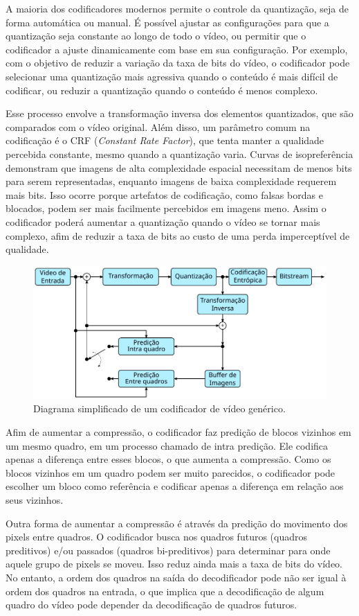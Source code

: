 A maioria dos codificadores modernos permite o controle da quantização, seja de forma automática ou manual. É possível ajustar as configurações para que a quantização seja constante ao longo de todo o vídeo, ou permitir que o codificador a ajuste dinamicamente com base em sua configuração. Por exemplo, com o objetivo de reduzir a variação da taxa de bits do vídeo, o codificador pode selecionar uma quantização mais agressiva quando o conteúdo é mais difícil de codificar, ou reduzir a quantização quando o conteúdo é menos complexo.

Esse processo envolve a transformação inversa dos elementos quantizados, que são comparados com o vídeo original. Além disso, um parâmetro comum na codificação é o CRF (\textit{Constant Rate Factor}), que tenta manter a qualidade percebida constante, mesmo quando a quantização varia. Curvas de isopreferência demonstram que imagens de alta complexidade espacial necessitam de menos bits para serem representadas, enquanto imagens de baixa complexidade requerem mais bits. Isso ocorre porque artefatos de codificação, como falsas bordas e blocados, podem ser mais facilmente percebidos em imagens meno. Assim o codificador poderá aumentar a quantização quando o vídeo se tornar mais complexo, afim de reduzir a taxa de bits ao custo de uma perda imperceptível de qualidade.

\begin{figure}
	\centering
	\includegraphics[width=0.7\linewidth]{fig/coding}
	\caption{Diagrama simplificado de um codificador de vídeo genérico.}
	\label{fig:coding}
\end{figure}

Afim de aumentar a compressão, o codificador faz predição de blocos vizinhos em um mesmo quadro, em um processo chamado de intra predição. Ele codifica apenas a diferença entre esses blocos, o que aumenta a compressão. Como os blocos vizinhos em um quadro podem ser muito parecidos, o codificador pode escolher um bloco como referência e codificar apenas a diferença em relação aos seus vizinhos.

Outra forma de aumentar a compressão é através da predição do movimento dos pixels entre quadros. O codificador busca nos quadros futuros (quadros preditivos) e/ou passados (quadros bi-preditivos) para determinar para onde aquele grupo de pixels se moveu. Isso reduz ainda mais a taxa de bits do vídeo. No entanto, a ordem dos quadros na saída do decodificador pode não ser igual à ordem dos quadros na entrada, o que implica que a decodificação de algum quadro do vídeo pode depender da decodificação de quadros futuros.

